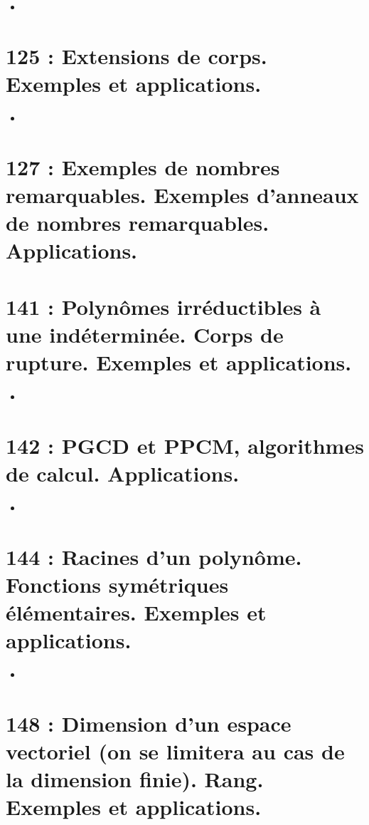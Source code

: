 \documentclass[a4paper,10pt,oneside,twocolumn,landscape]{book}
\begin{document}
\begin{itemize}
	\item
\end{itemize}

\section{125 : Extensions de corps. Exemples et applications.}

\begin{itemize}
	\item 
\end{itemize}

\section{127 : Exemples de nombres remarquables. Exemples d’anneaux de nombres remarquables. Applications.}


\section{141 : Polynômes irréductibles à une indéterminée. Corps de rupture. Exemples et applications.}

\begin{itemize}
	\item 
\end{itemize}

\section{142 : PGCD et PPCM, algorithmes de calcul. Applications.}

\begin{itemize}
	\item
\end{itemize}

\section{144 : Racines d’un polynôme. Fonctions symétriques élémentaires. Exemples et applications.}

\begin{itemize}
	\item
\end{itemize}

\section{148 : Dimension d’un espace vectoriel (on se limitera au cas de la dimension finie). Rang. Exemples et applications.}
\end{document}
